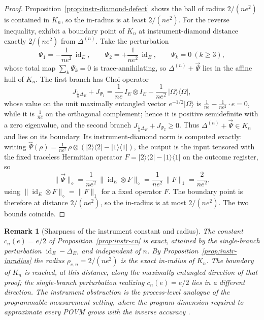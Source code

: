 \documentclass[11pt]{article}
\newtheorem{remark}[theorem]{Remark}
\DeclareMathOperator{\id}{id}
\begin{document}
\begin{proof}
Proposition~\ref{prop:instr-diamond-defect} shows the ball of radius
$2/(ne^2)$ is contained in $K_n$, so the in-radius is at least $2/(ne^2)$. For
the reverse inequality, exhibit a boundary point of $K_n$ at instrument-diamond
distance exactly $2/(ne^2)$ from $\Delta^{(n)}$. Take the perturbation
\[
\Psi_1=-\frac1{ne^2}\,\id_E,
\qquad
\Psi_2=+\frac1{ne^2}\,\id_E,
\qquad
\Psi_k=0\ (k\ge3),
\]
whose total map $\sum_k\Psi_k=0$ is trace-annihilating, so
$\Delta^{(n)}+\vec\Psi$ lies in the affine hull of $K_n$. The first branch has
Choi operator
\[
J_{\frac1n\Delta_E}+J_{\Psi_1}
=\frac1{ne}\,I_E\otimes I_E-\frac1{ne^2}\,|\Omega\rangle\langle\Omega|,
\]
whose value on the unit maximally entangled vector
$e^{-1/2}|\Omega\rangle$ is $\frac1{ne}-\frac1{ne^2}\cdot e=0$, while it is
$\frac1{ne}$ on the orthogonal complement; hence it is positive semidefinite with
a zero eigenvalue, and the second branch $J_{\frac1n\Delta_E}+J_{\Psi_2}\ge0$.
Thus $\Delta^{(n)}+\vec\Psi\in K_n$ and lies on its boundary. Its
instrument-diamond norm is computed exactly: writing
$\hat\Psi(\rho)=\frac1{ne^2}\,\rho\otimes(|2\rangle\langle2|-|1\rangle\langle1|)$,
the output is the input tensored with the fixed traceless Hermitian operator
$F=|2\rangle\langle2|-|1\rangle\langle1|$ on the outcome register, so
\[
\|\vec\Psi\|_\diamond
=\frac1{ne^2}\,\bigl\|\id_E\otimes F\bigr\|_\diamond
=\frac1{ne^2}\,\|F\|_1
=\frac{2}{ne^2},
\]
using $\|\id_E\otimes F\|_\diamond=\|F\|_1$ for a fixed operator $F$. The
boundary point is therefore at distance $2/(ne^2)$, so the in-radius is at most
$2/(ne^2)$. The two bounds coincide.
\end{proof}

\begin{remark}[Sharpness of the instrument constant and radius]
\label{rem:instr-radius}
The constant $c_n(e)=e/2$ of Proposition~\ref{prop:instr-cn} is exact, attained
by the single-branch perturbation $\id_E-\Delta_E$, and independent of $n$. By
Proposition~\ref{prop:instr-inradius} the radius $\rho_{e,n}=2/(ne^2)$ is the
exact in-radius of $K_n$. The boundary of $K_n$ is reached, at this distance,
along the maximally entangled direction of that proof; the single-branch
perturbation realizing $c_n(e)=e/2$ lies in a different direction. The
instrument obstruction is the process-level analogue of the programmable-measurement
setting, where the program dimension required to approximate every POVM grows
with the inverse accuracy \cite{PerezGarcia2006}.
\end{remark}
\end{document}
